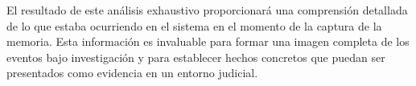 El resultado de este análisis exhaustivo proporcionará una comprensión detallada de lo que estaba ocurriendo en el sistema en el momento de la captura de la memoria. Esta información es invaluable para formar una imagen completa de los eventos bajo investigación y para establecer hechos concretos que puedan ser presentados como evidencia en un entorno judicial.


